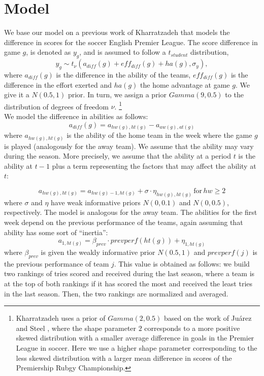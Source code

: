 \documentclass[]{article}
\begin{document}
\section{Model}
We base our model on a previous work of Kharratzadeh \cite{kharratzadeh2017hierarchical} that models the difference in scores for the soccer English Premier League. The score difference in game $g$, is denoted as $y_g$, and is assumed to follow  a $t_{student}$ distribution,
$$y_g\sim t_\nu (a_{diff}(g)+eff_{diff}(g)+ha(g),\sigma_y),$$
where $a_{diff}(g)$ is the difference in the ability of the teams, $eff_{diff}(g)$ is the difference in the effort exerted and $ha(g)$ the home advantage at game $g$. We give it a $N(0.5,1)$ prior. In turn, we assign a prior $Gamma(9,0.5)$ to the distribution of degrees of freedom $\nu$. \footnote{Kharratzadeh \cite{kharratzadeh2017hierarchical} uses a prior of $Gamma(2,0.5)$ based on the work of Ju\'arez and Steel \cite{juarez2010model}, where the shape parameter $2$ corresponds to a more positive skewed distribution with a smaller average difference in goals in the Premier League in soccer. Here we use a higher shape parameter corresponding to the less skewed distribution with a larger mean difference in scores  of the Premiership Rubgy Championship.}\\

We model the difference in abilities as follows:
$$a_{diff}(g)=a_{hw(g),ht(g)}-a_{aw(g),at(g)}$$
where $a_{hw(g),ht(g)}$ is the ability of the home team in the week where the game $g$ is played (analogously for the away team). We assume that the ability may vary during the season. More precisely, we assume that the ability at a period $t$ is the ability at $t-1$ plus a term representing the factors that may affect the ability at $t$:

$$a_{hw(g),ht(g)}=a_{hw(g)-1,ht(g)}+\sigma \cdot \eta_{hw(g),ht(g)}\, \mbox{for} \, hw\geq 2$$
where $\sigma$ and $\eta$ have weak informative priors $N(0,0.1)$ and $N(0,0.5)$, respectively. The model is analogous for the away team. The abilities for the first week depend on the previous performance of the teams, again assuming that ability has some sort of ``inertia'':
$$a_{1,ht(g)}=\beta_{prev}\cdot prevperf (ht(g))+\eta_{1,ht(g)} $$
where $\beta_{prev}$ is given the weakly informative prior $N(0.5,1)$ and $prevperf(j)$ is the previous performance of team $j$. This value is obtained as follows: we build two rankings of tries scored and received during the last season, where a team is at the top of both rankings if it  has scored the most and received the least tries in the last season. Then, the two rankings are normalized and averaged.\\
\end{document}
